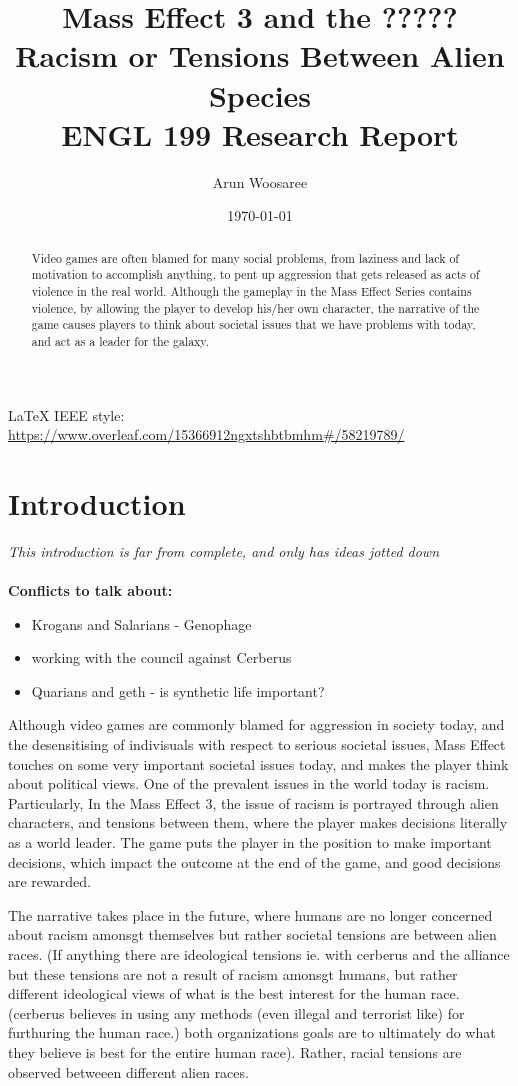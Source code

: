 \documentclass[journal]{IEEEtran}
\title{Mass Effect 3 and the ????? Racism or Tensions Between Alien Species\\
\vspace{.25cm}\large ENGL 199 Research Report \vspace{-.5cm}}
\author{\LARGE Arun Woosaree}
\date{\today}
\begin{document}
\maketitle %

\begin{abstract}
 Video games are often blamed for many social problems, from laziness and lack of motivation to accomplish anything, to pent up aggression that gets released as acts of violence in the real world. Although the gameplay in the Mass Effect Series contains violence, by allowing the player to develop his/her own character, the narrative of the game causes players to think about societal issues that we have problems with today, and act as a leader for the galaxy.
\end{abstract}

\LaTeX{} IEEE style:
\url{https://www.overleaf.com/15366912ngxtshbtbmhm#/58219789/}
\section{Introduction}
\textit{This introduction is far from complete, and only has ideas jotted down}
\\ \\
\textbf{Conflicts to talk about:}
\begin{itemize}
 \item Krogans and Salarians - Genophage
 \item working with the council against Cerberus
 \item Quarians and geth - is synthetic life important?
\end{itemize}
Although video games are commonly blamed for aggression in society today,
and the desensitising of indivisuals with respect to serious societal issues, Mass Effect  touches on some very important societal issues today, and
makes the player think about political views. One of the prevalent issues in the world today is
racism. Particularly, In the Mass Effect 3, the issue of racism is portrayed through alien characters, and
tensions between them, where the player makes decisions literally as a world leader. The game puts the player in the position to
make important decisions, which impact the outcome at the end of the game, and good decisions are rewarded.

The narrative takes place in the future, where humans are no longer concerned about racism amonsgt themselves but rather societal
tensions are between alien races. (If anything there are ideological tensions ie. with cerberus and the alliance but these
tensions are not a result of racism amonsgt humans, but rather different ideological views of what is the best interest for the human race. (cerberus believes in using any methods (even illegal and terrorist like) for furthuring the human race.)
both organizations goals are to ultimately do what they believe is best for the entire human race). Rather, racial tensions are observed betweeen different alien races.
\end{document}
